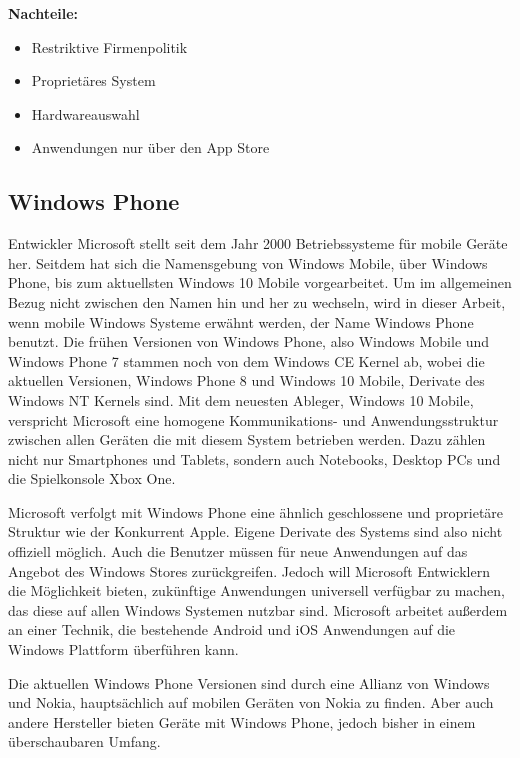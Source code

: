\textbf{Nachteile:}
\begin{itemize}
	\item Restriktive Firmenpolitik
	\item Proprietäres System
	\item Hardwareauswahl
	\item Anwendungen nur über den App Store
\end{itemize}

\subsection{Windows Phone}
Entwickler Microsoft stellt seit dem Jahr 2000 Betriebssysteme für mobile Geräte her. \citep{microsoft_mobile} 
Seitdem hat sich die Namensgebung von Windows Mobile, über Windows Phone, bis zum aktuellsten Windows 10 Mobile vorgearbeitet. Um im allgemeinen Bezug nicht zwischen den Namen hin und her zu wechseln, wird in dieser Arbeit, wenn mobile Windows Systeme erwähnt werden, der Name Windows Phone benutzt.
Die frühen Versionen von Windows Phone, also Windows Mobile und Windows Phone 7 stammen noch von dem Windows CE Kernel ab, wobei die aktuellen Versionen, Windows Phone 8 und Windows 10 Mobile, Derivate des Windows NT Kernels sind. Mit dem neuesten Ableger, Windows 10 Mobile, verspricht Microsoft eine homogene Kommunikations- und Anwendungsstruktur zwischen allen Geräten die mit diesem System betrieben werden. Dazu zählen nicht nur Smartphones und Tablets, sondern auch Notebooks, Desktop PCs und die Spielkonsole Xbox One. \citep{windows10_features}

Microsoft verfolgt mit Windows Phone eine ähnlich geschlossene und proprietäre Struktur wie der Konkurrent Apple. Eigene Derivate des Systems sind also nicht offiziell möglich. Auch die Benutzer müssen für neue Anwendungen auf das Angebot des Windows Stores zurückgreifen. Jedoch will Microsoft Entwicklern die Möglichkeit bieten, zukünftige Anwendungen universell verfügbar zu machen, das diese auf allen Windows Systemen nutzbar sind. Microsoft arbeitet außerdem an einer Technik, die bestehende Android und iOS Anwendungen auf die Windows Plattform überführen kann. \citep{wp_with_android_ios}

Die aktuellen Windows Phone Versionen sind durch eine Allianz von Windows und Nokia, hauptsächlich auf mobilen Geräten von Nokia zu finden.\citep{microsoft_nokia}
Aber auch andere Hersteller bieten Geräte mit Windows Phone, jedoch bisher in einem überschaubaren Umfang.
\\

